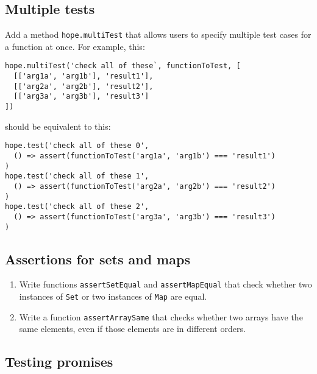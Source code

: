 \documentclass[krantzl]{krantz}
\begin{document}
\subsection*{Multiple tests}


Add a method \texttt{hope.multiTest} that allows users to specify
multiple test cases for a function at once.
For example, this:

\begin{lstlisting}[frame=tblr]
hope.multiTest('check all of these`, functionToTest, [
  [['arg1a', 'arg1b'], 'result1'],
  [['arg2a', 'arg2b'], 'result2'],
  [['arg3a', 'arg3b'], 'result3']
])
\end{lstlisting}


\noindent should be equivalent to this:

\begin{lstlisting}[frame=tblr]
hope.test('check all of these 0',
  () => assert(functionToTest('arg1a', 'arg1b') === 'result1')
)
hope.test('check all of these 1',
  () => assert(functionToTest('arg2a', 'arg2b') === 'result2')
)
hope.test('check all of these 2',
  () => assert(functionToTest('arg3a', 'arg3b') === 'result3')
)
\end{lstlisting}

\subsection*{Assertions for sets and maps}

\begin{enumerate}

\item 

Write functions \texttt{assertSetEqual} and \texttt{assertMapEqual}
    that check whether two instances of \texttt{Set} or two instances of \texttt{Map} are equal.



\item 

Write a function \texttt{assertArraySame}
    that checks whether two arrays have the same elements,
    even if those elements are in different orders.



\end{enumerate}

\subsection*{Testing promises}
\end{document}
